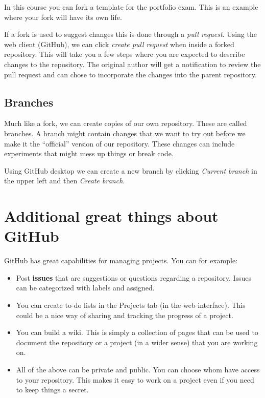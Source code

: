 \documentclass[
  11pt,
  letterpaper,
]{scrbook}
\providecommand{\tightlist}{%
  \setlength{\itemsep}{0pt}\setlength{\parskip}{0pt}}\usepackage{longtable,booktabs,array}
\begin{document}
In this course you can fork a template for the portfolio exam. This is
an example where your fork will have its own life.

If a fork is used to suggest changes this is done through a \emph{pull
request}. Using the web client (GitHub), we can click \emph{create pull
request} when inside a forked repository. This will take you a few steps
where you are expected to describe changes to the repository. The
original author will get a notification to review the pull request and
can chose to incorporate the changes into the parent repository.

\hypertarget{branches}{%
\subsection{Branches}\label{branches}}

Much like a fork, we can create copies of our own repository. These are
called branches. A branch might contain changes that we want to try out
before we make it the ``official'' version of our repository. These
changes can include experiments that might mess up things or break code.

Using GitHub desktop we can create a new branch by clicking
\emph{Current branch} in the upper left and then \emph{Create branch}.

\hypertarget{additional-great-things-about-github}{%
\section{Additional great things about
GitHub}\label{additional-great-things-about-github}}

GitHub has great capabilities for managing projects. You can for
example:

\begin{itemize}
\tightlist
\item
  Post \textbf{issues} that are suggestions or questions regarding a
  repository. Issues can be categorized with labels and assigned.
\item
  You can create to-do lists in the Projects tab (in the web interface).
  This could be a nice way of sharing and tracking the progress of a
  project.
\item
  You can build a wiki. This is simply a collection of pages that can be
  used to document the repository or a project (in a wider sense) that
  you are working on.
\item
  All of the above can be private and public. You can choose whom have
  access to your repository. This makes it easy to work on a project
  even if you need to keep things a secret.
\end{itemize}
\end{document}
